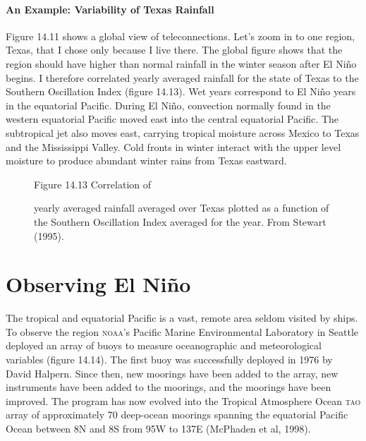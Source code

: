 \paragraph{An Example: Variability of Texas Rainfall}
Figure 14.11 shows a global view of teleconnections. Let's zoom in to one
region, Texas, that I chose only because I live there. The global figure shows
that the region should have higher than normal rainfall in the winter season
after El Ni\~{n}o begins. I therefore correlated yearly averaged rainfall for the
state of Texas to the Southern Oscillation Index (figure
14.13). Wet years correspond to El Ni\~{n}o years in the equatorial Pacific. During El
Ni\~{n}o, convection normally found in the western equatorial Pacific moved east into the
central equatorial Pacific. The subtropical jet also moves east, carrying tropical
moisture across Mexico to Texas and the Mississippi Valley. Cold fronts in winter
interact with the upper level moisture to produce abundant winter rains from Texas
eastward.

\begin{figure}[t!]
\centering
\footnotesize
Figure 14.13 Correlation of \rule{0mm}{4ex}yearly averaged rainfall averaged over Texas plotted as a function of the Southern Oscillation Index averaged for the year.  From Stewart (1995).

\label{fig:texasrain}
\vspace{-4ex}
\end{figure}

\section{Observing El Ni\~{n}o}
The tropical and equatorial Pacific is a vast, remote area seldom visited by ships. To observe the region \textsc{noaa}'s Pacific Marine Environmental Laboratory in Seattle deployed an array of buoys to measure oceanographic and meteorological variables (figure 14.14). The first buoy was successfully deployed in 1976 by David Halpern. Since then, new moorings have been added to the array, new instruments have been added to the moorings, and the moorings have been improved. The program has now evolved into the Tropical Atmosphere Ocean \textsc{tao} array of approximately 70 deep-ocean moorings spanning the equatorial Pacific Ocean between 8\degrees N and 8\degrees S from 95\degrees W to 137\degrees E (McPhaden et al, 1998).

